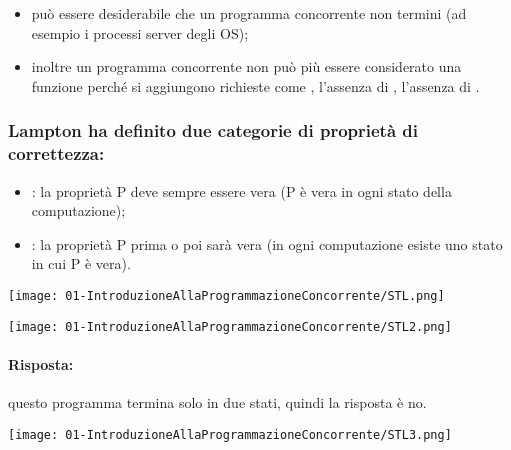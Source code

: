 \begin{itemize}
  \item può essere desiderabile che un programma concorrente non termini (ad esempio i processi server degli OS);
  \item inoltre un programma concorrente non può più essere considerato una funzione perché si aggiungono richieste come , l'assenza di , l'assenza di .
\end{itemize}


\subsubsection{Lampton ha definito due categorie di proprietà di correttezza:}
\begin{itemize}
  \item {}: la proprietà P deve sempre essere vera (P è vera in ogni stato della computazione);
  \item {}: la proprietà P prima o poi sarà vera (in ogni computazione esiste uno stato in cui P è vera).
\end{itemize}



\begin{center}
    \texttt{[image: 01-IntroduzioneAllaProgrammazioneConcorrente/STL.png]}
\end{center}


\begin{center}
    \texttt{[image: 01-IntroduzioneAllaProgrammazioneConcorrente/STL2.png]}
\end{center}

\paragraph{Risposta:} questo programma termina solo in due stati, quindi la risposta è no.



\begin{center}
    \texttt{[image: 01-IntroduzioneAllaProgrammazioneConcorrente/STL3.png]}
\end{center}

